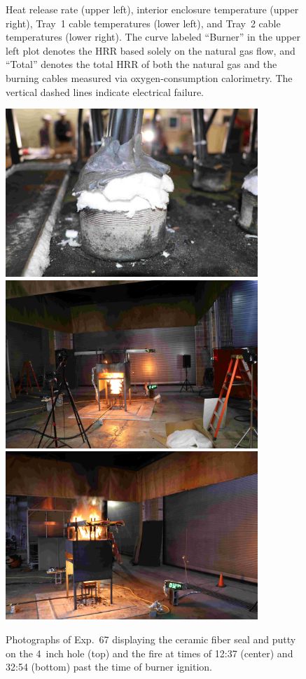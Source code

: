 \begin{figure}[H]
\caption[HRR and temperatures of Exp.~67]{Heat release rate (upper left), interior enclosure temperature (upper right), Tray~1 cable temperatures (lower left), and Tray~2 cable temperatures (lower right). The curve labeled ``Burner'' in the upper left plot denotes the HRR based solely on the natural gas flow, and ``Total'' denotes the total HRR of both the natural gas and the burning cables measured via oxygen-consumption calorimetry. The vertical dashed lines indicate electrical failure.}
\label{fig:Test_67}
\end{figure}

\begin{figure}[p]
\centering
\includegraphics[height=2.50in]{../FIGURES/Test_67_Photo_1} \\ \vspace{0.1in}
\includegraphics[height=2.50in]{../FIGURES/Test_67_Photo_2} \\ \vspace{0.1in}
\includegraphics[height=2.50in]{../FIGURES/Test_67_Photo_3}
\caption[Photographs of Exp.~67]{Photographs of Exp.~67 displaying the ceramic fiber seal and putty on the 4~inch hole (top) and the fire at times of 12:37 (center) and 32:54 (bottom) past the time of burner ignition.}
\label{fig:Test_67_photos}
\end{figure}



